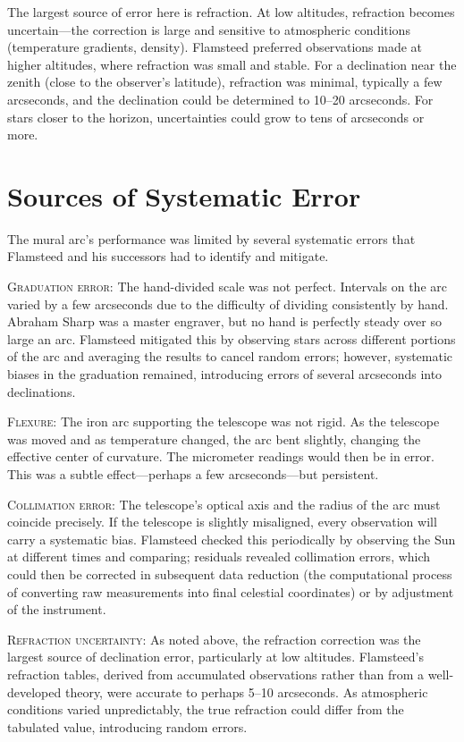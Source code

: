 The largest source of error here is refraction. At low altitudes, refraction becomes uncertain—the correction is large and sensitive to atmospheric conditions (temperature gradients, density). Flamsteed preferred observations made at higher altitudes, where refraction was small and stable. For a declination near the zenith (close to the observer's latitude), refraction was minimal, typically a few arcseconds, and the declination could be determined to 10–20 arcseconds. For stars closer to the horizon, uncertainties could grow to tens of arcseconds or more.

\section{Sources of Systematic Error}

The mural arc's performance was limited by several systematic errors that Flamsteed and his successors had to identify and mitigate.

\textsc{Graduation error:} The hand-divided scale was not perfect. Intervals on the arc varied by a few arcseconds due to the difficulty of dividing consistently by hand. Abraham Sharp was a master engraver, but no hand is perfectly steady over so large an arc. Flamsteed mitigated this by observing stars across different portions of the arc and averaging the results to cancel random errors; however, systematic biases in the graduation remained, introducing errors of several arcseconds into declinations.

\textsc{Flexure:} The iron arc supporting the telescope was not rigid. As the telescope was moved and as temperature changed, the arc bent slightly, changing the effective center of curvature. The micrometer readings would then be in error. This was a subtle effect—perhaps a few arcseconds—but persistent.

\textsc{Collimation error:} The telescope's optical axis and the radius of the arc must coincide precisely. If the telescope is slightly misaligned, every observation will carry a systematic bias. Flamsteed checked this periodically by observing the Sun at different times and comparing; residuals revealed collimation errors, which could then be corrected in subsequent data reduction (the computational process of converting raw measurements into final celestial coordinates) or by adjustment of the instrument.

\textsc{Refraction uncertainty:} As noted above, the refraction correction was the largest source of declination error, particularly at low altitudes. Flamsteed's refraction tables, derived from accumulated observations rather than from a well-developed theory, were accurate to perhaps 5–10 arcseconds. As atmospheric conditions varied unpredictably, the true refraction could differ from the tabulated value, introducing random errors.

